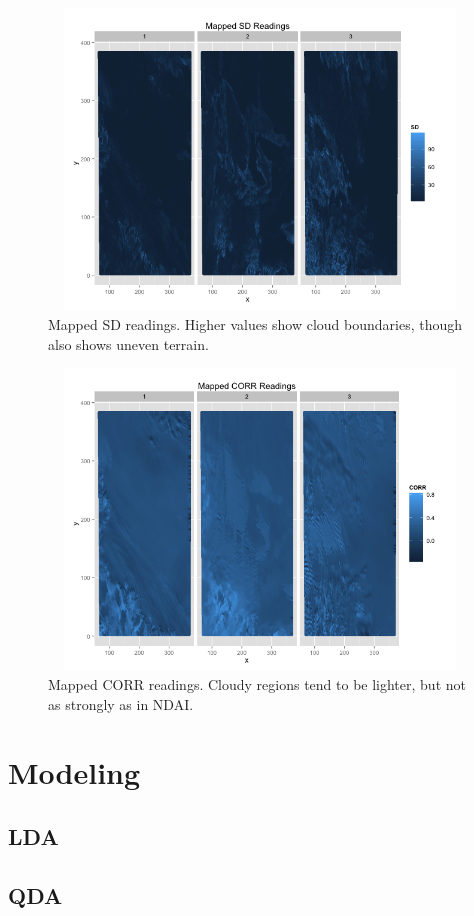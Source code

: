 \documentclass{article}\usepackage[]{graphicx}\usepackage[]{color}
\begin{document}
\begin{figure}[H]
\includegraphics[width = 18cm, height = 8cm]{SDEDA.png}
\caption{Mapped SD readings. Higher values show cloud boundaries, though also shows uneven terrain.}
\end{figure}

\begin{figure}[H]
\includegraphics[width = 18cm, height = 8cm]{CORREDA.png}
\caption{Mapped CORR readings. Cloudy regions tend to be lighter, but not as strongly as in NDAI.}
\end{figure}

\section{Modeling}

\subsection{LDA}

\subsection{QDA}
\end{document}
